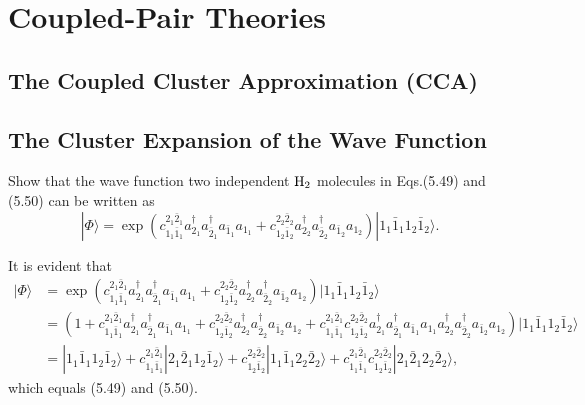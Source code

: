 \documentclass[a4paper]{book}
\newcounter{exercise}[chapter]
\newcounter{solution}[chapter]
\begin{document}
	\section{Coupled-Pair Theories}
	
	\subsection{The Coupled Cluster Approximation (CCA)}
	
	\subsection{The Cluster Expansion of the Wave Function}

	\begin{exercise}
	Show that the wave function two independent $\ce{H2}$ molecules in Eqs.(5.49) and (5.50) can be written as
	\[
		| \Phi \rangle = \exp{( c^{2_1 \bar{2}_1}_{1_1 \bar{1}_1} a^\dagger_{2_1} a^\dagger_{\bar{2}_1} a_{\bar{1}_1} a_{1_1} + c^{2_2 \bar{2}_2}_{1_2 \bar{1}_2} a^\dagger_{2_2} a^\dagger_{\bar{2}_2} a_{\bar{1}_2} a_{1_2} )} | 1_1 \bar{1}_1 1_2 \bar{1}_2 \rangle.
	\]
	\end{exercise}
	
	\begin{solution}
	It is evident that
	\begin{align*}
		| \Phi \rangle &= \exp( c^{ 2_1 \bar{2}_1}_{ 1_1 \bar{1}_1 } a^\dagger_{2_1} a^\dagger_{\bar{2}_1} a_{\bar{1}_1} a_{1_1} + c^{ 2_2 \bar{2}_2 }_{ 1_2 \bar{1}_2 } a^\dagger_{2_2} a^\dagger_{\bar{2}_2} a_{\bar{1}_2} a_{1_2} ) | 1_1 \bar{1}_1 1_2 \bar{1}_2 \rangle \\
		&= ( 1 + c^{ 2_1 \bar{2}_1}_{ 1_1 \bar{1}_1 } a^\dagger_{2_1} a^\dagger_{\bar{2}_1} a_{\bar{1}_1} a_{1_1} + c^{ 2_2 \bar{2}_2 }_{ 1_2 \bar{1}_2 } a^\dagger_{2_2} a^\dagger_{\bar{2}_2} a_{\bar{1}_2} a_{1_2} + c^{ 2_1 \bar{2}_1}_{ 1_1 \bar{1}_1 } c^{ 2_2 \bar{2}_2 }_{ 1_2 \bar{1}_2 } a^\dagger_{2_1} a^\dagger_{\bar{2}_1} a_{\bar{1}_1} a_{1_1}  a^\dagger_{2_2} a^\dagger_{\bar{2}_2} a_{\bar{1}_2} a_{1_2} ) | 1_1 \bar{1}_1 1_2 \bar{1}_2 \rangle \\
		&= | 1_1 \bar{1}_1 1_2 \bar{1}_2 \rangle + c^{ 2_1 \bar{2}_1}_{ 1_1 \bar{1}_1 } | 2_1 \bar{2}_1 1_2 \bar{1}_2 \rangle + c^{ 2_2 \bar{2}_2 }_{ 1_2 \bar{1}_2 } | 1_1 \bar{1}_1 2_2 \bar{2}_2 \rangle +  c^{ 2_1 \bar{2}_1}_{ 1_1 \bar{1}_1 } c^{ 2_2 \bar{2}_2 }_{ 1_2 \bar{1}_2 } | 2_1 \bar{2}_1 2_2 \bar{2}_2 \rangle,
	\end{align*}
	which equals (5.49) and (5.50). 
			
	\end{solution}	
\end{document}
